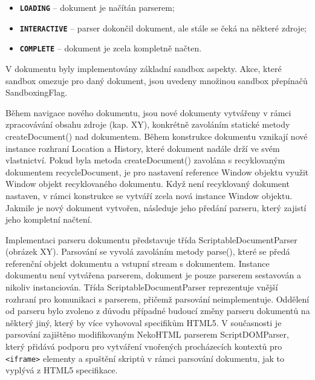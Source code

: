 \begin{itemize}
  \item \textbf{\texttt{LOADING}} -- dokument je načítán parserem;
  \item \textbf{\texttt{INTERACTIVE}} -- parser dokončil dokument, ale stále se čeká na některé zdroje;
  \item \textbf{\texttt{COMPLETE}} -- dokument je zcela kompletně načten.
\end{itemize}

V dokumentu byly implementovány základní sandbox aspekty. Akce, které sandbox omezuje pro daný dokument, jsou uvedeny množinou sandbox přepínačů SandboxingFlag. 

Během navigace nového dokumentu, jsou nové dokumenty vytvářeny v rámci zpracovávání obsahu zdroje (kap. XY), konkrétně zavoláním statické metody createDocument() nad dokumentem. Během konstrukce dokumentu vznikají nové instance rozhraní Location a History, které dokument nadále drží ve svém vlastnictví. Pokud byla metoda createDocument() zavolána s recyklovaným dokumentem recycleDocument, je pro nastavení reference Window objektu využit Window objekt recyklovaného dokumentu. Když není recyklovaný dokument nastaven, v rámci konstrukce se vytváří zcela nová instance Window objektu. Jakmile je nový dokument vytvořen, následuje jeho předání parseru, který zajistí jeho kompletní načtení.

Implementaci parseru dokumentu představuje třída ScriptableDocumentParser (obrázek XY). Parsování se vyvolá zavoláním metody parse(), které se předá referenční objekt dokumentu a vstupní stream s dokumentem. Instance dokumentu není vytvářena parserem, dokument je pouze parserem sestavován a nikoliv instanciován. Třída ScriptableDocumentParser reprezentuje vnější rozhraní pro komunikaci s parserem, přičemž parsování neimplementuje. Oddělení od parseru bylo zvoleno z důvodu případné budoucí změny parseru dokumentů na některý jiný, který by více vyhovoval specifikům HTML5. V současnosti je parsování zajištěno modifikovaným NekoHTML parserem ScriptDOMParser, který přidává podporu pro vytváření vnořených procházecích kontextů pro \texttt{<iframe>} elementy a spuštění skriptů v rámci parsování dokumentu, jak to vyplývá z HTML5 specifikace. 

